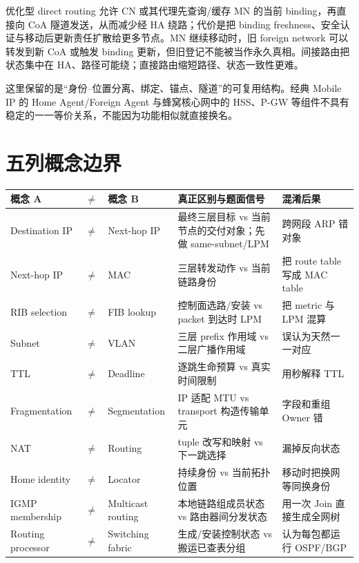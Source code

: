 \documentclass[11pt,a4paper]{ctexart}
\begin{document}
优化型 direct routing 允许 CN 或其代理先查询/缓存 MN 的当前 binding，再直接向 CoA 隧道发送，从而减少经 HA 绕路；代价是把 binding freshness、安全认证与移动后更新责任扩散给更多节点。MN 继续移动时，旧 foreign network 可以转发到新 CoA 或触发 binding 更新，但旧登记不能被当作永久真相。间接路由把状态集中在 HA、路径可能绕；直接路由缩短路径、状态一致性更难。

这里保留的是“身份--位置分离、绑定、锚点、隧道”的可复用结构。经典 Mobile IP 的 Home Agent/Foreign Agent 与蜂窝核心网中的 HSS、P-GW 等组件不具有稳定的一一等价关系，不能因为功能相似就直接换名。

\section{五列概念边界}

\begin{center}
\small
\begin{tabularx}{\linewidth}{L{1.75cm}C{0.35cm}L{1.75cm}Y Y}
\toprule
概念 A & $\neq$ & 概念 B & 真正区别与题面信号 & 混淆后果\\
\midrule
Destination IP & $\neq$ & Next-hop IP & 最终三层目标 vs 当前节点的交付对象；先做 same-subnet/LPM & 跨网段 ARP 错对象\\
Next-hop IP & $\neq$ & MAC & 三层转发动作 vs 当前链路身份 & 把 route table 写成 MAC table\\
RIB selection & $\neq$ & FIB lookup & 控制面选路/安装 vs packet 到达时 LPM & 把 metric 与 LPM 混算\\
Subnet & $\neq$ & VLAN & 三层 prefix 作用域 vs 二层广播作用域 & 误认为天然一一对应\\
TTL & $\neq$ & Deadline & 逐跳生命预算 vs 真实时间限制 & 用秒解释 TTL\\
Fragmentation & $\neq$ & Segmentation & IP 适配 MTU vs transport 构造传输单元 & 字段和重组 Owner 错\\
NAT & $\neq$ & Routing & tuple 改写和映射 vs 下一跳选择 & 漏掉反向状态\\
Home identity & $\neq$ & Locator & 持续身份 vs 当前拓扑位置 & 移动时把换网等同换身份\\
IGMP membership & $\neq$ & Multicast routing & 本地链路组成员状态 vs 路由器间分发状态 & 用一次 Join 直接生成全网树\\
Routing processor & $\neq$ & Switching fabric & 生成/安装控制状态 vs 搬运已查表分组 & 认为每包都运行 OSPF/BGP\\
\bottomrule
\end{tabularx}
\end{center}
\end{document}
